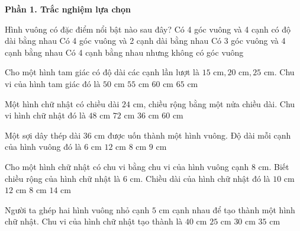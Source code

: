 \textbf{Phần 1. Trắc nghiệm lựa chọn}

\begin{ex} %
Hình vuông có đặc điểm nổi bật nào sau đây?
\choice
{\True Có 4 góc vuông và 4 cạnh có độ dài bằng nhau}
{Có 4 góc vuông và 2 cạnh dài bằng nhau}
{Có 3 góc vuông và 4 cạnh bằng nhau}
{Có 4 cạnh bằng nhau nhưng không có góc vuông}
\end{ex}

\begin{ex} %
Cho một hình tam giác có độ dài các cạnh lần lượt là $15\text{ cm}, 20\text{ cm}, 25\text{ cm}$. Chu vi của hình tam giác đó là
\choice
{$50\text{ cm}$}
{$55\text{ cm}$}
{\True $60\text{ cm}$}
{$65\text{ cm}$}
\end{ex}

\begin{ex} %
Một hình chữ nhật có chiều dài $24\text{ cm}$, chiều rộng bằng một nửa chiều dài. Chu vi hình chữ nhật đó là
\choice
{$48\text{ cm}$}
{\True $72\text{ cm}$}
{$36\text{ cm}$}
{$60\text{ cm}$}
\end{ex}

\begin{ex} %
Một sợi dây thép dài $36\text{ cm}$ được uốn thành một hình vuông. Độ dài mỗi cạnh của hình vuông đó là
\choice
{$6\text{ cm}$}
{$12\text{ cm}$}
{$8\text{ cm}$}
{\True $9\text{ cm}$}
\end{ex}

\begin{ex} %
Cho một hình chữ nhật có chu vi bằng chu vi của hình vuông cạnh $8\text{ cm}$. Biết chiều rộng của hình chữ nhật là $6\text{ cm}$. Chiều dài của hình chữ nhật đó là
\choice
{\True $10\text{ cm}$}
{$12\text{ cm}$}
{$8\text{ cm}$}
{$14\text{ cm}$}
\end{ex}

\begin{ex} %
Người ta ghép hai hình vuông nhỏ cạnh $5\text{ cm}$ cạnh nhau để tạo thành một hình chữ nhật. Chu vi của hình chữ nhật tạo thành là
\choice
{$40\text{ cm}$}
{$25\text{ cm}$}
{\True $30\text{ cm}$}
{$35\text{ cm}$}
\end{ex}

